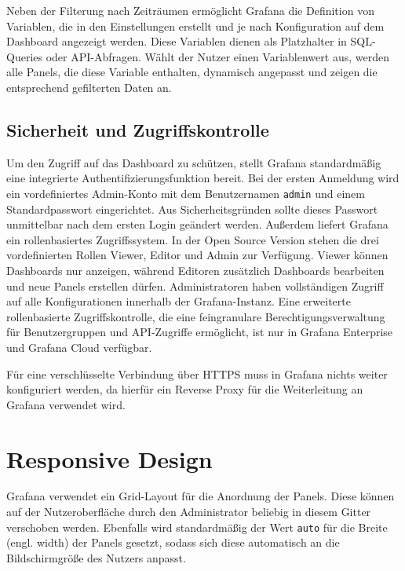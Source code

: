 Neben der Filterung nach Zeiträumen ermöglicht Grafana die Definition von Variablen, die in den Einstellungen erstellt und je nach Konfiguration auf dem Dashboard angezeigt werden. Diese Variablen dienen als Platzhalter in SQL-Queries oder API-Abfragen. Wählt der Nutzer einen Variablenwert aus, werden alle Panels, die diese Variable enthalten, dynamisch angepasst und zeigen die entsprechend gefilterten Daten an. \parencite{GrafanaLabsVariables}

\subsection{Sicherheit und Zugriffskontrolle}
Um den Zugriff auf das Dashboard zu schützen, stellt Grafana standardmäßig eine integrierte Authentifizierungsfunktion bereit. Bei der ersten Anmeldung wird ein vordefiniertes Admin-Konto mit dem Benutzernamen \verb|admin| und einem Standardpasswort eingerichtet. Aus Sicherheitsgründen sollte dieses Passwort unmittelbar nach dem ersten Login geändert werden. Außerdem liefert Grafana ein rollenbasiertes Zugriffssystem. In der Open Source Version stehen die drei vordefinierten Rollen Viewer, Editor und Admin zur Verfügung. Viewer können Dashboards nur anzeigen, während Editoren zusätzlich Dashboards bearbeiten und neue Panels erstellen dürfen. Administratoren haben vollständigen Zugriff auf alle Konfigurationen innerhalb der Grafana-Instanz. Eine erweiterte rollenbasierte Zugriffskontrolle, die eine feingranulare Berechtigungsverwaltung für Benutzergruppen und API-Zugriffe ermöglicht, ist nur in Grafana Enterprise und Grafana Cloud verfügbar. \parencite{GrafanaRBAC}

Für eine verschlüsselte Verbindung über HTTPS muss in Grafana nichts weiter konfiguriert werden, da hierfür ein Reverse Proxy für die Weiterleitung an Grafana verwendet wird.

\section{Responsive Design}
\label{sec:responsive-design}
Grafana verwendet ein Grid-Layout für die Anordnung der Panels. Diese können auf der Nutzeroberfläche durch den Administrator beliebig in diesem Gitter verschoben werden. Ebenfalls wird standardmäßig der Wert \verb|auto| für die Breite (engl. width) der Panels gesetzt, sodass sich diese automatisch an die Bildschirmgröße des Nutzers anpasst.